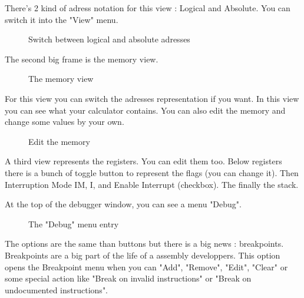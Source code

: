 \documentclass[10pt]{report}
\begin{document}
There's 2 kind of adress notation for this view : Logical and Absolute.\newline 
You can switch it into the "View" menu.\newline

\begin{figure}[H]
\centering
{}
\caption{Switch between logical and absolute adresses}
\end{figure}
The second big frame is the memory view.\newline

\begin{figure}[H]
\centering
{}
\caption{The memory view}
\end{figure}
For this view you can switch the adresses representation if you want.\newline
In this view you can see what your calculator contains.\newline
You can also edit the memory and change some values by your own.\newline
\begin{figure}[H]
\centering
{}
\caption{Edit the memory}
\end{figure}
A third view represents the registers.\newline
You can edit them too.\newline
Below registers there is a bunch of toggle button to represent the flags (you can change it).\newline
Then Interruption Mode IM, I, and Enable Interrupt (checkbox).\newline
The finally the stack.\newline

At the top of the debugger window, you can see a menu "Debug".\newline
\begin{figure}[H]
\centering
{}
\caption{The "Debug" menu entry}
\end{figure}
The options are the same than buttons but there is a big news : breakpoints.\newline
Breakpoints are a big part of the life of a assembly developpers.\newline
This option opens the Breakpoint menu when you can "Add", "Remove", "Edit", "Clear" or some special action like "Break on invalid instructions" or "Break on undocumented instructions".\newline
\end{document}

